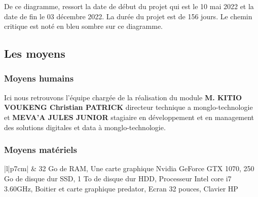 De ce diagramme, ressort la date de début du projet qui est le 10 mai 2022 et la date de fin le 03 décembre 2022. La durée du projet est de 156 jours. Le chemin critique est noté en bleu sombre sur ce diagramme.

\subsection{Les moyens}

\subsubsection{Moyens humains}

Ici nous retrouvons l'équipe chargée de la réalisation du module \textbf{M. KITIO VOUKENG Christian PATRICK} directeur technique a monglo-technologie et \textbf{MEVA’A JULES JUNIOR} stagiaire en développement et en management des solutions digitales et data à monglo-technologie.

\subsubsection{Moyens matériels}

\begin{table}[H]
	\centering
	\caption{Moyens matériels}
	\label{tab:my-table}
	\begin{tabular}{|l|p{7cm}|}
		\hline
		 & 32 Go de RAM, Une carte graphique Nvidia GeForce GTX 1070, 250 Go de disque dur SSD, 1 To de disque dur HDD, Processeur Intel core i7 3.60GHz, Boitier et carte graphique predator, Ecran 32 pouces, Clavier HP \\ \hline
		                                                                                                                                                                                                         \\ \hline
		                                                                                                                                                                                                                      \\ \hline
		                                                                                                                                                                                                                      \\ \hline
	\end{tabular}
\end{table}

